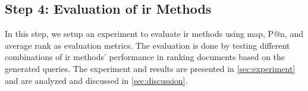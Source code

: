 \subsection*{Step 4: Evaluation of \gls{ir} Methods}
In this step, we setup an experiment to evaluate \gls{ir} methods using \gls{map}, P@n, and average rank as evaluation metrics.
The evaluation is done by testing different combinations of \gls{ir} methods' performance in ranking documents based on the generated queries. 
The experiment and results are presented in \autoref{sec:experiment} and are analyzed and discussed in \autoref{sec:discussion}.



